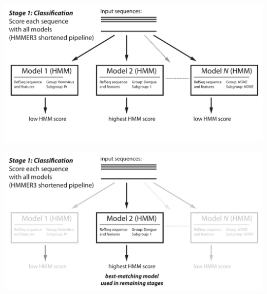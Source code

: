 \documentclass[landscape]{slides}
\begin{document}
\begin{slide}
\begin{center}

\includegraphics[width=9.5in]{figs/v-annotate-stage1-1}

\end{center}
\vfill
\end{slide}
\begin{slide}
\begin{center}

\includegraphics[width=9.5in]{figs/v-annotate-stage1-2}

\end{center}
\vfill
\end{slide}
\end{document}
